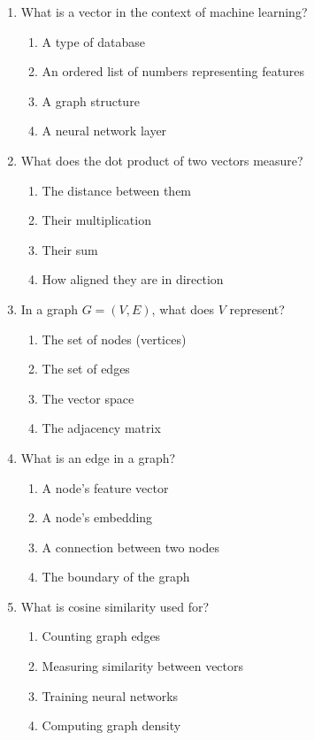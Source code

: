\documentclass[12pt,a4paper]{article}
\begin{document}
\begin{enumerate}

\item What is a vector in the context of machine learning?
\begin{enumerate}[label=\Alph*)]
    \item A type of database
    \item An ordered list of numbers representing features
    \item A graph structure
    \item A neural network layer
\end{enumerate}

\item What does the dot product of two vectors measure?
\begin{enumerate}[label=\Alph*)]
    \item The distance between them
    \item Their multiplication
    \item Their sum
    \item How aligned they are in direction
\end{enumerate}

\item In a graph $G = (V, E)$, what does $V$ represent?
\begin{enumerate}[label=\Alph*)]
    \item The set of nodes (vertices)
    \item The set of edges
    \item The vector space
    \item The adjacency matrix
\end{enumerate}

\item What is an edge in a graph?
\begin{enumerate}[label=\Alph*)]
    \item A node's feature vector
    \item A node's embedding
    \item A connection between two nodes
    \item The boundary of the graph
\end{enumerate}

\item What is cosine similarity used for?
\begin{enumerate}[label=\Alph*)]
    \item Counting graph edges
    \item Measuring similarity between vectors
    \item Training neural networks
    \item Computing graph density
\end{enumerate}


\end{enumerate}
\end{document}
